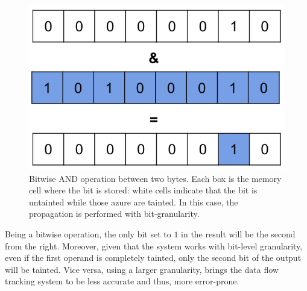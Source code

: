 \documentclass[LaM,binding=0.6cm]{sapthesis}
\begin{document}
\begin{figure}[h!]
\centering
\includegraphics[scale=.4]{images/techn2}
\caption{Bitwise AND operation between two bytes. Each box is the memory cell where the bit is stored: white cells indicate that the bit is untainted while those azure are tainted. In this case, the propagation is performed with bit-granularity.}
\label{fig:techn2}
\end{figure}

Being a bitwise operation, the only bit set to $1$ in the result will be the second from the right. Moreover, given that the system works with bit-level granularity, even if the first operand is completely tainted, only the second bit of the output will be tainted. Vice versa, using a larger granularity, brings the data flow tracking system to be less accurate and thus, more error-prone.
\end{document}

